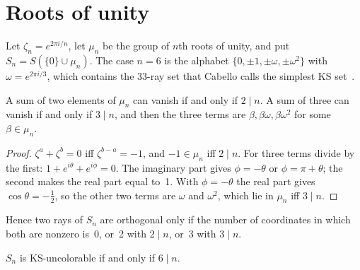 \section{Roots of unity}\label{sec:roots}

Let $\zeta_n=e^{2\pi i/n}$, let $\mu_n$ be the group of $n$th roots of unity, and put
$S_n=S(\{0\}\cup\mu_n)$.  The case $n=6$ is the alphabet $\{0,\pm1,\pm\omega,\pm\omega^2\}$ with
$\omega=e^{2\pi i/3}$, which contains the 33-ray set that Cabello calls the simplest KS
set~\cite{Cabello2025simplest}.

\begin{lemma}\label{lem:sums}
A sum of two elements of $\mu_n$ can vanish if and only if $2\mid n$.  A sum of three can vanish
if and only if $3\mid n$, and then the three terms are $\beta,\beta\omega,\beta\omega^2$ for some
$\beta\in\mu_n$.
\end{lemma}

\begin{proof}
$\zeta^a+\zeta^b=0$ iff $\zeta^{b-a}=-1$, and $-1\in\mu_n$ iff $2\mid n$.  For three terms divide
by the first: $1+e^{i\theta}+e^{i\phi}=0$.  The imaginary part gives $\phi=-\theta$ or
$\phi=\pi+\theta$; the second makes the real part equal to~1.  With $\phi=-\theta$ the real part
gives $\cos\theta=-\tfrac12$, so the other two terms are $\omega$ and $\omega^2$, which lie in
$\mu_n$ iff $3\mid n$.
\end{proof}

Hence two rays of $S_n$ are orthogonal only if the number of coordinates in which both are
nonzero is~0, or~2 with $2\mid n$, or~3 with $3\mid n$.

\begin{theorem}\label{thm:6n}
$S_n$ is KS-uncolorable if and only if $6\mid n$.
\end{theorem}

